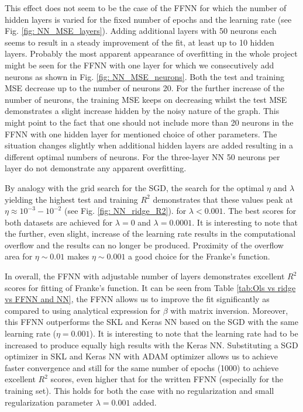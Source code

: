 \documentclass{emulateapj}
\begin{document}
This effect does not seem to be the case of the FFNN for which the number of hidden layers is varied for the fixed number of epochs and the learning rate (see Fig. \ref{fig: NN_MSE_layers}). Adding additional layers with 50 neurons each seems to result in a steady improvement of the fit, at least up to 10 hidden layers. Probably the most apparent  appearance of overfitting in the whole project might be seen for the FFNN with one layer for which we consecutively add neurons as shown in Fig. \ref{fig: NN_MSE_neurons}. Both the test and training MSE decrease up to the number of neurons 20. For the further increase of the number of neurons, the training MSE keeps on decreasing whilst the test MSE demonstrates a slight increase hidden by the noisy nature of the graph. This might point to the fact that one should not include more than 20 neurons in the FFNN with one hidden layer for mentioned choice of other parameters. The situation changes slightly when additional hidden layers are added resulting in a different optimal numbers of neurons. For the three-layer NN 50 neurons per layer do not demonstrate any apparent overfitting.

By analogy with the grid search for the SGD, the search for the optimal $\eta$ and $\lambda$ yielding the highest test and training $R^2$ demonstrates that these values peak at $\eta\approx10^{-3}-10^{-2}$ (see Fig. \ref{fig: NN_ridge_R2}). for $\lambda<0.001$. The best scores for both datasets are achieved for $\lambda=0$ and $\lambda=0.0001$. It is interesting to note that the further, even slight, increase of the learning rate results in the computational overflow and the results can no longer be produced. Proximity of the overflow area for $\eta\sim0.01$ makes $\eta\sim0.001$ a good choice for the Franke's function.


In overall, the FFNN with adjustable number of layers demonstrates excellent $R^2$ scores for fitting of Franke's function. It can be seen from Table \ref{tab:Ols vs ridge vs FFNN and NN}, the FFNN allows us to improve the fit significantly as compared to using analytical expression for $\beta$ with matrix inversion. Moreover, this FFNN outperforms the SKL and Keras NN based on the SGD with the same learning rate ($\eta=0.001$). It is interesting to note that the learning rate had to be increased to produce equally high results with the Keras NN. Substituting a SGD optimizer in SKL and Keras NN with ADAM optimizer allows us to achieve faster convergence and still for the same number of epochs (1000) to achieve excellent $R^2$ scores, even higher that for the written FFNN (especially for the training set). This holds for both the case with no regularization and small regularization parameter $\lambda=0.001$ added.
\end{document}
